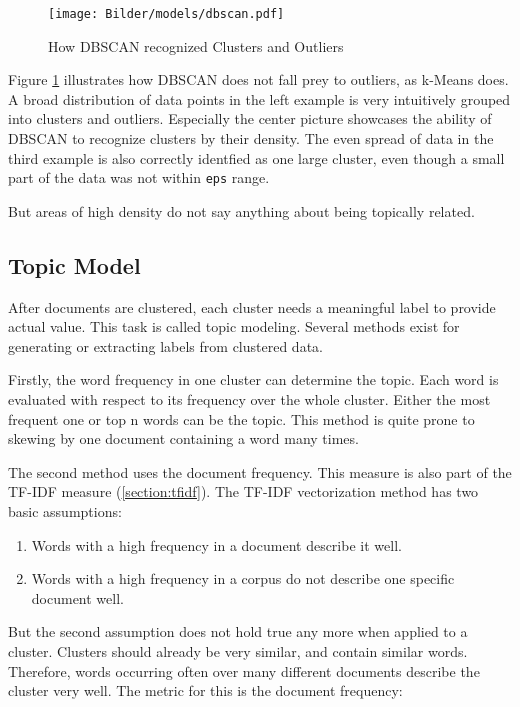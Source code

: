 		 \begin{figure}[!h]
			\centering
			\texttt{[image: Bilder/models/dbscan.pdf]}
			\caption[How DBSCAN recognized Clusters and Outliers]{How DBSCAN recognized Clusters and Outliers \cite{sklearn}}
			\label{fig:dbscan-viz}
		\end{figure}
	
		Figure \ref{fig:dbscan-viz} illustrates how \ac{DBSCAN} does not fall prey to outliers, as k-Means does. A broad distribution of data points in the left example is very intuitively grouped into clusters and outliers. Especially the center picture showcases the ability of DBSCAN to recognize clusters by their density. The even spread of data in the third example is also correctly identfied as one large cluster, even though a small part of the data was not within \lstinline|eps| range.
		
		But areas of high density do not say anything about being topically related.

		
\subsection{Topic Model}
After documents are clustered, each cluster needs a meaningful label to provide actual value. This task is called topic modeling. Several methods exist for generating or extracting labels from clustered data. 

Firstly, the word frequency in one cluster can determine the topic. Each word is evaluated with respect to its frequency over the whole cluster. Either the most frequent one or top n words can be the topic.
This method is quite prone to skewing by one document containing a word many times.

The second method uses the document frequency. This measure is also part of the \ac{TF-IDF} measure (\ref{section:tfidf}).
The \ac{TF-IDF} vectorization method has two basic assumptions:
\begin{enumerate}
	\item Words with a high frequency in a document describe it well.
	\item Words with a high frequency in a corpus do not describe one specific document well.
\end{enumerate}

But the second assumption does not hold true any more when applied to a cluster. Clusters should already be very similar, and contain similar words. Therefore, words occurring often over many different documents describe the cluster very well. The metric for this is the document frequency:

